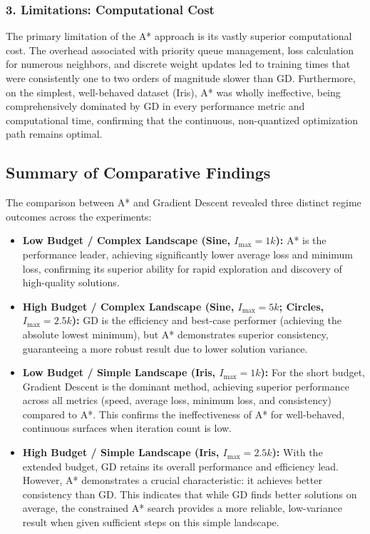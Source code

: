 \subsubsection*{3. Limitations: Computational Cost}

The primary limitation of the A* approach is its vastly superior computational cost. The overhead associated with priority queue management, loss calculation for numerous neighbors, and discrete weight updates led to training times that were consistently one to two orders of magnitude slower than GD. Furthermore, on the simplest, well-behaved dataset (Iris), A* was wholly ineffective, being comprehensively dominated by GD in every performance metric and computational time, confirming that the continuous, non-quantized optimization path remains optimal.

\subsection{Summary of Comparative Findings}
\label{sec:comparative_findings}

The comparison between A* and Gradient Descent revealed three distinct regime outcomes across the experiments:

\begin{itemize}
    \item \textbf{Low Budget / Complex Landscape (Sine, $I_{\text{max}}=1k$):} A* is the performance leader, achieving significantly lower average loss and minimum loss, confirming its superior ability for rapid exploration and discovery of high-quality solutions.
    \item \textbf{High Budget / Complex Landscape (Sine, $I_{\text{max}}=5k$; Circles, $I_{\text{max}}=2.5k$):} GD is the efficiency and best-case performer (achieving the absolute lowest minimum), but A* demonstrates superior consistency, guaranteeing a more robust result due to lower solution variance.
    \item \textbf{Low Budget / Simple Landscape (Iris, $I_{\text{max}}=1k$):} For the short budget, Gradient Descent is the dominant method, achieving superior performance across all metrics (speed, average loss, minimum loss, and consistency) compared to A*. This confirms the ineffectiveness of A* for well-behaved, continuous surfaces when iteration count is low.
    \item \textbf{High Budget / Simple Landscape (Iris, $I_{\text{max}}=2.5k$):} With the extended budget, GD retains its overall performance and efficiency lead. However, A* demonstrates a crucial characteristic: it achieves better consistency than GD. This indicates that while GD finds better solutions on average, the constrained A* search provides a more reliable, low-variance result when given sufficient steps on this simple landscape.
\end{itemize}


